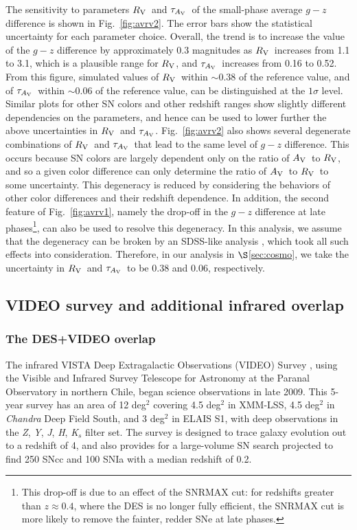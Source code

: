 \documentclass[preprint2]{aastex}    %
\newcommand\rv{$R_{\rm V}$}
\newcommand\av{$A_{\rm V}$}
\newcommand\tauav{$\tau_{A_{\rm V}}$}
\begin{document}
The sensitivity to parameters \rv\ and \tauav\ of the small-phase average $g-z$ difference 
is shown in Fig.~\ref{fig:avrv2}. The error bars show the statistical 
uncertainty for each parameter choice. 
Overall, the trend is to increase the value of the $g-z$ difference by approximately
0.3 magnitudes as \rv\ increases from 1.1 to 3.1, which is a
plausible range for \rv, and \tauav\ increases from 0.16 to 0.52. 
From this figure, simulated values of \rv\ within $\sim$0.38 of
the reference value, and of \tauav\ within $\sim$0.06 of the 
reference value, can be distinguished at the $1\sigma$ level.
Similar plots for other SN colors and other redshift ranges show slightly
different dependencies on the parameters, and hence can be used to lower further
the above uncertainties in \rv\ and \tauav.
Fig.~\ref{fig:avrv2} also shows several degenerate combinations of \rv\ and 
\tauav\ that lead to the same level of $g-z$ difference.
This occurs because SN colors are largely dependent only on the ratio of
\av\ to \rv, and so a given color difference can only determine
the ratio of \av\ to \rv\ to some uncertainty.
This degeneracy is reduced by
considering the behaviors of other color differences and their redshift dependence.
In addition, the second feature of Fig.~\ref{fig:avrv1}, 
namely the drop-off in the $g-z$ difference at late phases\footnote{This drop-off is due to an effect of the SNRMAX cut: for redshifts greater than $z \approx 0.4$, where the DES is no longer fully efficient, the SNRMAX cut is more likely to remove the fainter, redder SNe at late phases.}, can also be used to resolve 
this degeneracy.
In this analysis, we assume that the degeneracy can be broken by an
SDSS-like analysis \citep{kes09}, which took all such effects into consideration.
Therefore, in our analysis in $\S$\ref{sec:cosmo}, we take the uncertainty in \rv\ and \tauav\ 
to be 0.38 and 0.06, respectively. 

\subsection{VIDEO survey and additional infrared overlap}\label{sec:video}

\subsubsection{The DES+VIDEO overlap}\label{sec:opportunity}
The infrared VISTA Deep Extragalactic
Observations (VIDEO) Survey \citep[see, e.g.,][]{video}, using the Visible and Infrared Survey Telescope for Astronomy
at the Paranal Observatory in northern Chile, began science observations in
late 2009. This 5-year survey has an area of 12 deg$^2$ covering 4.5 deg$^2$ in XMM-LSS, 
4.5 deg$^2$ in \textit{Chandra} Deep Field South, and 3 deg$^2$ in ELAIS S1, with deep observations 
in the \emph{Z}, \emph{Y}, \emph{J}, \emph{H}, \emph{K}$_s$ filter set.
The survey is designed to trace galaxy evolution out to a redshift of 4, 
and also provides for a large-volume SN search projected to 
find 250 SNcc and 100 SNIa with a median redshift of 0.2.
\end{document}
